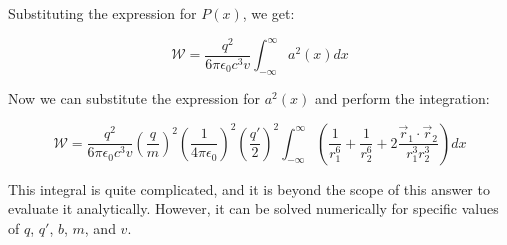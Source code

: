 \documentclass{article}
\begin{document}
Substituting the expression for $P(x)$, we get:

$$\mathcal{W} = \frac{q^2}{6 \pi \epsilon_0 c^3 v} \int_{-\infty}^{\infty} a^2(x) dx$$

Now we can substitute the expression for $a^2(x)$ and perform the integration:

$$\mathcal{W} = \frac{q^2}{6 \pi \epsilon_0 c^3 v} \left(\frac{q}{m}\right)^2 \left(\frac{1}{4 \pi \epsilon_0}\right)^2 \left(\frac{q'}{2}\right)^2 \int_{-\infty}^{\infty} \left(\frac{1}{r_1^6} + \frac{1}{r_2^6} + 2 \frac{\vec{r}_1 \cdot \vec{r}_2}{r_1^3 r_2^3}\right) dx$$

This integral is quite complicated, and it is beyond the scope of this answer to evaluate it analytically. However, it can be solved numerically for specific values of $q$, $q'$, $b$, $m$, and $v$.
    
\end{document}
